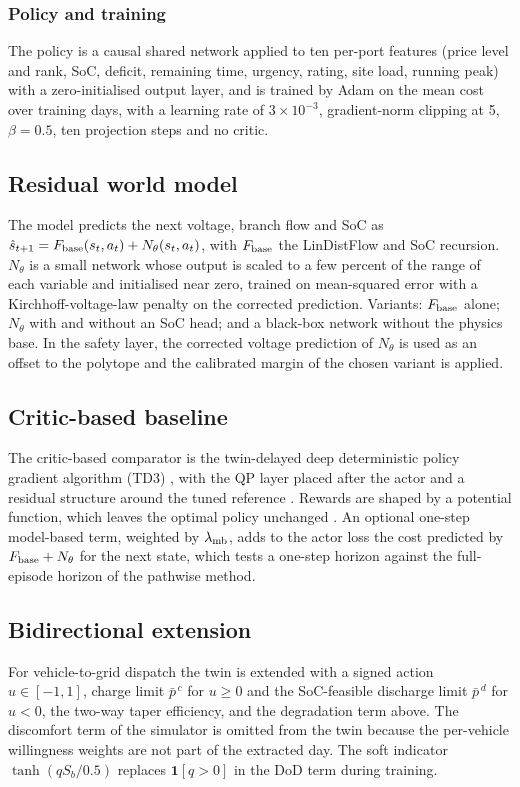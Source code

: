 \documentclass[11pt]{article}
\begin{document}
\subsubsection{Policy and training}
The policy is a causal shared network applied to ten per-port features (price level and rank, SoC, deficit, remaining time, urgency, rating, site load, running peak) with a zero-initialised output layer, and is trained by Adam on the mean cost over training days, with a learning rate of $3\times10^{-3}$, gradient-norm clipping at 5, $\beta=0.5$, ten projection steps and no critic.

\subsection{Residual world model}
The model predicts the next voltage, branch flow and SoC as $\hat s_{t+1}=F_{\rm base}(s_t,a_t)+N_\theta(s_t,a_t)$, with $F_{\rm base}$ the LinDistFlow and SoC recursion. $N_\theta$ is a small network whose output is scaled to a few percent of the range of each variable and initialised near zero, trained on mean-squared error with a Kirchhoff-voltage-law penalty on the corrected prediction. Variants: $F_{\rm base}$ alone; $N_\theta$ with and without an SoC head; and a black-box network without the physics base. In the safety layer, the corrected voltage prediction of $N_\theta$ is used as an offset to the polytope and the calibrated margin of the chosen variant is applied.

\subsection{Critic-based baseline}
The critic-based comparator is the twin-delayed deep deterministic policy gradient algorithm (TD3) \cite{td3}, with the QP layer placed after the actor and a residual structure around the tuned reference \cite{johannink,silverres}. Rewards are shaped by a potential function, which leaves the optimal policy unchanged \cite{ng}. An optional one-step model-based term, weighted by $\lambda_{\rm mb}$, adds to the actor loss the cost predicted by $F_{\rm base}+N_\theta$ for the next state, which tests a one-step horizon against the full-episode horizon of the pathwise method.

\subsection{Bidirectional extension}
For vehicle-to-grid dispatch the twin is extended with a signed action $u\in[-1,1]$, charge limit $\bar p^{\,c}$ for $u\ge0$ and the SoC-feasible discharge limit $\bar p^{\,d}$ for $u<0$, the two-way taper efficiency, and the degradation term above. The discomfort term of the simulator is omitted from the twin because the per-vehicle willingness weights are not part of the extracted day. The soft indicator $\tanh(qS_b/0.5)$ replaces $\mathbf 1[q>0]$ in the DoD term during training.
\end{document}

